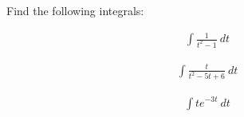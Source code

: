 

\begin{problem}
\item Find the following integrals:

  \begin{subproblem}
  \item 
    \begin{eqnarray*}
      \int \frac{1}{t^2-1} ~ dt 
    \end{eqnarray*}
    \vfill

  \item 
    \begin{eqnarray*}
      \int \frac{t}{t^2-5t+6} ~ dt
    \end{eqnarray*}
    \vfill

  \item 
    \begin{eqnarray*}
      \int t e^{-3t} ~ dt
    \end{eqnarray*}
    \vfill
      
  \end{subproblem}
\end{problem}

